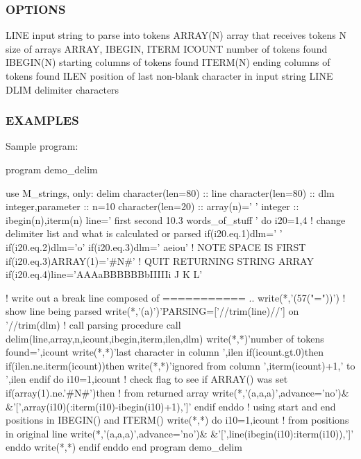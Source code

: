 \subsubsection*{O\+P\+T\+I\+O\+NS}

L\+I\+NE input string to parse into tokens A\+R\+R\+A\+Y(\+N) array that receives tokens N size of arrays A\+R\+R\+AY, I\+B\+E\+G\+IN, I\+T\+E\+RM I\+C\+O\+U\+NT number of tokens found I\+B\+E\+G\+I\+N(\+N) starting columns of tokens found I\+T\+E\+R\+M(\+N) ending columns of tokens found I\+L\+EN position of last non-\/blank character in input string L\+I\+NE D\+L\+IM delimiter characters

\subsubsection*{E\+X\+A\+M\+P\+L\+ES}

Sample program\+: \begin{DoxyVerb}program demo_delim

use M_strings, only: delim
character(len=80) :: line
character(len=80) :: dlm
integer,parameter :: n=10
character(len=20) :: array(n)=' '
integer           :: ibegin(n),iterm(n)
line=' first  second 10.3 words_of_stuff  '
do i20=1,4
   ! change delimiter list and what is calculated or parsed
   if(i20.eq.1)dlm=' '
   if(i20.eq.2)dlm='o'
   if(i20.eq.3)dlm=' aeiou'    ! NOTE SPACE IS FIRST
   if(i20.eq.3)ARRAY(1)='#N#'  ! QUIT RETURNING STRING ARRAY
   if(i20.eq.4)line='AAAaBBBBBBbIIIIIi  J K L'

   ! write out a break line composed of =========== ..
   write(*,'(57("="))')
   ! show line being parsed
   write(*,'(a)')'PARSING=['//trim(line)//'] on '//trim(dlm)
   ! call parsing procedure
   call delim(line,array,n,icount,ibegin,iterm,ilen,dlm)
   write(*,*)'number of tokens found=',icount
   write(*,*)'last character in column ',ilen
   if(icount.gt.0)then
      if(ilen.ne.iterm(icount))then
         write(*,*)'ignored from column ',iterm(icount)+1,' to ',ilen
      endif
      do i10=1,icount
         ! check flag to see if ARRAY() was set
         if(array(1).ne.'#N#')then
            ! from returned array
            write(*,'(a,a,a)',advance='no')&
            &'[',array(i10)(:iterm(i10)-ibegin(i10)+1),']'
         endif
      enddo
      ! using start and end positions in IBEGIN() and ITERM()
      write(*,*)
      do i10=1,icount
         ! from positions in original line
         write(*,'(a,a,a)',advance='no')&
         &'[',line(ibegin(i10):iterm(i10)),']'
      enddo
      write(*,*)
   endif
enddo
end program demo_delim
\end{DoxyVerb}


